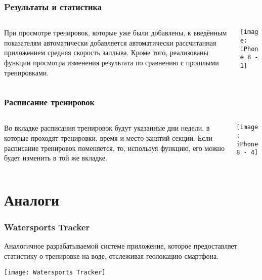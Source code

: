 \documentclass[10pt,utf8,presentation,notheorems,xcolor=dvipsnames,compress]{beamer}
\begin{document}
\begin{frame}
\frametitle{Pезультаты и статистика}
\begin{columns}[c]

\begin{column}{.5\textwidth}
При просмотре тренировок, которые уже были добавлены, к введённым показателям автоматически добавляется автоматически рассчитанная приложением
средняя скорость заплыва. Кроме того, реализованы функции просмотра изменения результата по сравнению с прошлыми тренировками.
\end{column}

\begin{column}{.5\textwidth}
\begin{center}
\texttt{[image: iPhone 8 - 1]}%
\end{center}
\end{column}

\end{columns}
\end{frame}

\begin{frame}
\frametitle{Расписание тренировок}
\begin{columns}[c]

\begin{column}{.5\textwidth}
Во вкладке расписания тренировок будут указанные дни недели, в которые проходят тренировки, время и место занятий секции. Если расписание
тренировок поменяется, то, используя функцию, его можно будет изменить
в той же вкладке.
\end{column}

\begin{column}{.5\textwidth}
\begin{center}
\texttt{[image: iPhone 8 - 4]}%
\end{center}
\end{column}

\end{columns}
\end{frame}


\section{Аналоги}
\begin{frame}
\frametitle{Watersports Tracker}
Аналогичное разрабатываемой системе приложение, которое предоставляет статистику о тренировке на воде, отслеживая геолокацию смартфона.
\begin{center}
\texttt{[image: Watersports Tracker]}%
\end{center}
\end{frame}
\end{document}
